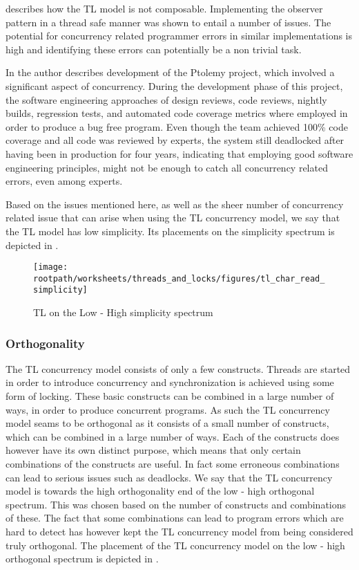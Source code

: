  describes how the \ac{TL} model is not composable. Implementing the observer pattern in a thread safe manner was shown to entail a number of issues. The potential for concurrency related programmer errors in similar implementations is high and identifying these errors can potentially be a non trivial task.

In \cite{lee2006problem} the author describes development of the Ptolemy project\cite{lee1999overview}, which involved a significant aspect of concurrency. During the development phase of this project, the software engineering approaches of design reviews, code reviews, nightly builds, regression tests, and automated code coverage metrics where employed in order to produce a bug free program\cite[p. 8]{lee2006problem}. Even though the team achieved 100\% code coverage and all code was reviewed by experts, the system still deadlocked after having been in production for four years, indicating that employing good software engineering principles, might not be enough to catch all concurrency related errors, even among experts.

Based on the issues mentioned here, as well as the sheer number of concurrency related issue that can arise when using the \ac{TL} concurrency model, we say that the \ac{TL} model has low simplicity. Its placements on the simplicity spectrum is depicted in .

\begin{figure}[htbp]
\centering
 \texttt{[image: \\rootpath/worksheets/threads\_and\_locks/figures/tl\_char\_read\_simplicity]} 
 \caption{\ac{TL} on the Low - High simplicity spectrum}
\label{fig:char_read_simplicity}
\end{figure}

\subsubsection{Orthogonality}\label{sec:tl_orthogonality}
The \ac{TL} concurrency model consists of only a few constructs. Threads are started in order to introduce concurrency and synchronization is achieved using some form of locking. These basic constructs can be combined in a large number of ways, in order to produce concurrent programs. As such the \ac{TL} concurrency model seams to be orthogonal as it consists of a small number of constructs, which can be combined in a large number of ways. Each of the constructs does however have its own distinct purpose, which means that only certain combinations of the constructs are useful. In fact some erroneous combinations can lead to serious issues such as deadlocks. We say that the \ac{TL} concurrency model is towards the high orthogonality end of the low - high orthogonal spectrum. This was chosen based on the number of constructs and combinations of these. The fact that some combinations can lead to program errors which are hard to detect has however kept the \ac{TL} concurrency model from being considered truly orthogonal. The placement of the \ac{TL} concurrency model on the low - high orthogonal spectrum is depicted in .

